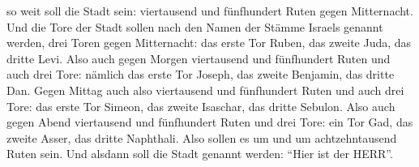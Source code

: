 so weit soll die Stadt sein: viertausend und fünfhundert Ruten gegen
Mitternacht.  Und die Tore der Stadt sollen nach den Namen
der Stämme Israels genannt werden, drei Toren gegen Mitternacht: das
erste Tor Ruben, das zweite Juda, das dritte Levi.  Also
auch gegen Morgen viertausend und fünfhundert Ruten und auch drei Tore:
nämlich das erste Tor Joseph, das zweite Benjamin, das dritte Dan.
 Gegen Mittag auch also viertausend und fünfhundert Ruten
und auch drei Tore: das erste Tor Simeon, das zweite Isaschar, das
dritte Sebulon.  Also auch gegen Abend viertausend und
fünfhundert Ruten und drei Tore: ein Tor Gad, das zweite Asser, das
dritte Naphthali.  Also sollen es um und um achtzehntausend
Ruten sein. Und alsdann soll die Stadt genannt werden: ``Hier ist der
HERR''.
